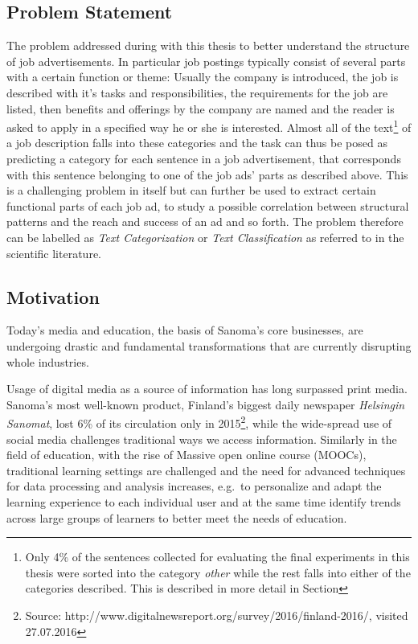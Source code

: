 \subsection{Problem Statement}

The problem addressed during with this thesis to better understand the structure of job advertisements. In particular job postings typically consist of several parts with a certain function or theme: Usually the company is introduced, the job is described with it's tasks and responsibilities, the requirements for the job are listed, then benefits and offerings by the company are named and the reader is asked to apply in a specified way he or she is interested.
Almost all of the text\footnote{Only 4\% of the sentences collected for evaluating the final experiments in this thesis were sorted into the category \emph{other} while the rest falls into either of the categories described. This is described in more detail in Section } of a job description falls into these categories and the task can thus be posed as predicting a category for each sentence in a job advertisement, that corresponds with this sentence belonging to one of the job ads' parts as described above.
This is a challenging problem in itself but can further be used to extract certain functional parts of each job ad, to study a possible correlation between structural patterns and the reach and success of an ad and so forth. The problem therefore can be labelled as \emph{Text Categorization} or \emph{Text Classification} as referred to in the scientific literature.


\subsection{Motivation}


Today's media and education, the basis of Sanoma's core businesses, are undergoing drastic and fundamental transformations that are currently disrupting whole industries.

Usage of digital media as a source of information has long surpassed print media. Sanoma's most well-known product, Finland's biggest daily newspaper \emph{Helsingin Sanomat}, lost 6\% of its circulation only in 2015\footnote{Source: http://www.digitalnewsreport.org/survey/2016/finland-2016/, visited 27.07.2016}, while the wide-spread use of social media challenges traditional ways we access information. Similarly in the field of education, with the rise of Massive open online course (MOOCs), traditional learning settings are challenged and the need for advanced techniques for data processing and analysis increases, e.g.\ to personalize and adapt the learning experience to each individual user and at the same time identify trends across large groups of learners to better meet the needs of education.

